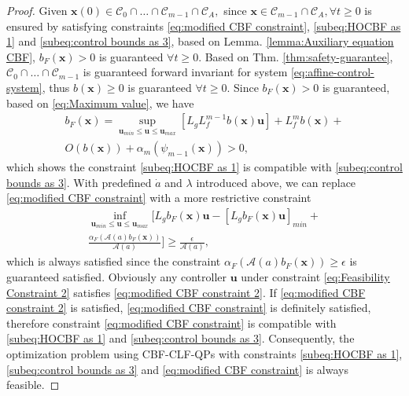 \documentclass[letterpaper, 10 pt, conference]{ieeeconf}
\theoremstyle{definition}
\begin{document}
\begin{proof}
Given $\boldsymbol{x}(0) \in \mathcal {C}_{0}\cap \dots \cap \mathcal {C}_{m-1}\cap \mathcal C_{A},$ since $\boldsymbol{x} \in \mathcal {C}_{m-1} \cap \mathcal {C}_{A}, \forall t \ge0$ is ensured by satisfying constraints \eqref{eq:modified CBF constraint}, \eqref{subeq:HOCBF as 1} and \eqref{subeq:control bounds as 3}, based on Lemma. \ref{lemma:Auxiliary equation CBF}, $b_{F}(\boldsymbol{x})> 0$ is guaranteed $\forall t \ge0.$ Based on Thm. \ref{thm:safety-guarantee}, $\mathcal {C}_{0}\cap \dots \cap \mathcal {C}_{m-1}$ is guaranteed forward invariant for system \eqref{eq:affine-control-system}, thus $b(\boldsymbol{x})\ge 0$ is guaranteed $\forall t \ge0.$ Since $b_{F}(\boldsymbol{x})> 0$ is guaranteed, based on \eqref{eq:Maximum value}, we have 
\begin{equation}
\label{eq:Feasibility Constraint 2}
\begin{split}
b_{F}(\boldsymbol{x})=\sup_{\boldsymbol{u}_{min}\le \boldsymbol{u} \le \boldsymbol{u}_{max}}[L_{g}L_{f}^{m-1}b(\boldsymbol{x})\boldsymbol{u}]+L_{f}^{m}b(\boldsymbol{x})+\\ O(b(\boldsymbol{x}))+
\alpha_{m}(\psi_{m-1}(\boldsymbol{x}))> 0,
\end{split}
\end{equation}
which shows the constraint \eqref{subeq:HOCBF as 1} is compatible with \eqref{subeq:control bounds as 3}. With predefined $\dot{a}$ and $\lambda$ introduced above, we can replace \eqref{eq:modified CBF constraint} with a more restrictive constraint
\begin{equation}
\label{eq:modified CBF constraint 2}
\begin{split}
\inf_{\boldsymbol{u}_{min}\le \boldsymbol{u} \le \boldsymbol{u}_{max}}[L_{g}b_{F}(\boldsymbol{x})\boldsymbol{u}-[L_{g}b_{F}(\boldsymbol{x})\boldsymbol{u}]_{min}+\\
\frac{\alpha_{F}(\mathcal{A}(a)b_{F}(\boldsymbol{x}))}{\mathcal{A}(a)}]\ge \frac{\epsilon}{\mathcal{A}(a)} ,
\end{split}
\end{equation}
which is always satisfied since the constraint $\alpha_{F}(\mathcal{A}(a)b_{F}(\boldsymbol{x}))\ge \epsilon$ is guaranteed satisfied. Obviously any controller $\boldsymbol{u}$ under constraint \eqref{eq:Feasibility Constraint 2} satisfies \eqref{eq:modified CBF constraint 2}. If \eqref{eq:modified CBF constraint 2} is satisfied, \eqref{eq:modified CBF constraint} is definitely satisfied, therefore constraint \eqref{eq:modified CBF constraint} is compatible with \eqref{subeq:HOCBF as 1}  and \eqref{subeq:control bounds as 3}. Consequently, the optimization problem using CBF-CLF-QPs with constraints \eqref{subeq:HOCBF as 1}, \eqref{subeq:control bounds as 3} and \eqref{eq:modified CBF constraint} is always feasible.  
\end{proof}
\end{document}
